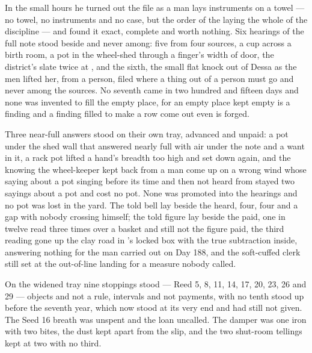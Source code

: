 \scenebreak

In the small hours he turned out the file as a man lays instruments on a towel --- no towel, no instruments and no case, but the order of the laying the whole of the discipline --- and found it exact, complete and worth nothing. Six hearings of the full note stood beside and never among: five from four sources, a cup across a birth room, a pot in the wheel-shed through a finger's width of door, the district's slate twice at , and the sixth, the small flat knock out of Dessa as the men lifted her, from a person, filed where a thing out of a person must go and never among the sources. No seventh came in two hundred and fifteen days and none was invented to fill the empty place, for an empty place kept empty is a finding and a finding filled to make a row come out even is forged.

Three near-full answers stood on their own tray, advanced and unpaid: a pot under the shed wall that answered nearly full with air under the note and a want in it, a rack pot lifted a hand's breadth too high and set down again, and the knowing the wheel-keeper kept back from a man come up on a wrong wind whose saying about a pot singing before its time and then not heard from stayed two sayings about a pot and cost no pot. None was promoted into the hearings and no pot was lost in the yard. The told bell lay beside the heard, four, four and a gap with nobody crossing himself; the told figure lay beside the paid, one in twelve read three times over a basket and still not the figure paid, the third reading gone up the clay road in 's locked box with the true subtraction inside, answering nothing for the man carried out on Day 188, and the soft-cuffed clerk still set at the out-of-line landing for a measure nobody called.

On the widened tray nine stoppings stood --- Reed 5, 8, 11, 14, 17, 20, 23, 26 and 29 --- objects and not a rule, intervals and not payments, with no tenth stood up before the seventh year, which now stood at its very end and had still not given. The Seed 16 breath was unspent and the loan uncalled. The damper was one iron with two bites, the dust kept apart from the slip, and the two shut-room tellings kept at two with no third.

